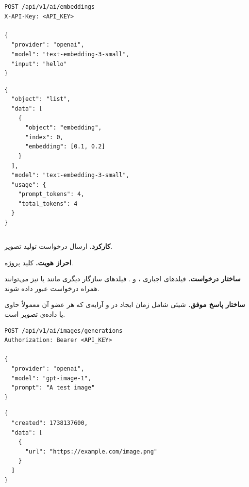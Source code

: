 \begin{latin}
\begin{lstlisting}[style=jsonStyle]
POST /api/v1/ai/embeddings
X-API-Key: <API_KEY>

{
  "provider": "openai",
  "model": "text-embedding-3-small",
  "input": "hello"
}
\end{lstlisting}
\end{latin}


\begin{latin}
\begin{lstlisting}[style=jsonStyle]
{
  "object": "list",
  "data": [
    {
      "object": "embedding",
      "index": 0,
      "embedding": [0.1, 0.2]
    }
  ],
  "model": "text-embedding-3-small",
  "usage": {
    "prompt_tokens": 4,
    "total_tokens": 4
  }
}
\end{lstlisting}
\end{latin}


\subsection{}
\textbf{کارکرد.} ارسال درخواست تولید تصویر.

\textbf{احراز هویت.} کلید پروژه.

\textbf{ساختار درخواست.} فیلدهای اجباری ،  و
. فیلدهای سازگار دیگری مانند  یا  نیز
می‌توانند همراه درخواست عبور داده شوند.

\textbf{ساختار پاسخ موفق.} شیئی شامل زمان ایجاد در  و آرایه‌ی
 که هر عضو آن معمولاً حاوی  یا داده‌ی تصویر است.

\begin{latin}
\begin{lstlisting}[style=jsonStyle]
POST /api/v1/ai/images/generations
Authorization: Bearer <API_KEY>

{
  "provider": "openai",
  "model": "gpt-image-1",
  "prompt": "A test image"
}
\end{lstlisting}
\end{latin}


\begin{latin}
\begin{lstlisting}[style=jsonStyle]
{
  "created": 1738137600,
  "data": [
    {
      "url": "https://example.com/image.png"
    }
  ]
}
\end{lstlisting}
\end{latin}

